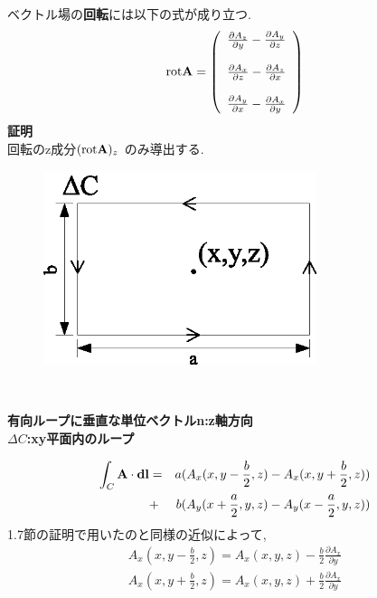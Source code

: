 \documentclass[../main]{subfiles}
\begin{document}
ベクトル場の{\bf 回転}には以下の式が成り立つ.
\begin{equation}
\mathrm{rot}{\bf A} =
\left( 
\begin{array}{cc}
\frac{\partial A_z}{\partial y}-\frac{\partial A_y}{\partial z}\\
\\
\frac{\partial A_x}{\partial z}-\frac{\partial A_z}{\partial x}\\
\\
\frac{\partial A_y}{\partial x}-\frac{\partial A_x}{\partial y}\\
\end{array}
\right)
\end{equation}
{\bf 証明} \\
回転のz成分$(\mathrm{rot}{\bf A})_z$ のみ導出する.\\
\begin{figure}[htbp]
 \begin{center}
  \includegraphics[width=80mm]{4.3.eps}
 \end{center}
 \caption{}
 \label{fig:three}
\end{figure}
\\
\begin{center}
\bf{有向ループに垂直な単位ベクトル{\bf n}:z軸方向} \\
\bf{ $\Delta C$:xy平面内のループ} \\
\end{center}
\begin{eqnarray}
\int_{C}^{} {\bf A} \cdot {\bf dl} &=& a( A_x(x,y-\frac{b}{2},z)-A_x(x,y+\frac{b}{2},z) ) \\
&+&b ( A_y(x+\frac{a}{2},y,z)-A_y(x-\frac{a}{2},y,z) )
\end{eqnarray}
1.7節の証明で用いたのと同様の近似によって,
\begin{eqnarray}
A_x(x,y-\frac{b}{2},z) = A_x(x,y,z)-\frac{b}{2} \frac{\partial A_x}{\partial y} \\
A_x(x,y+\frac{b}{2},z) = A_x(x,y,z)+\frac{b}{2} \frac{\partial A_x}{\partial y}
\end{eqnarray}
\end{document}
